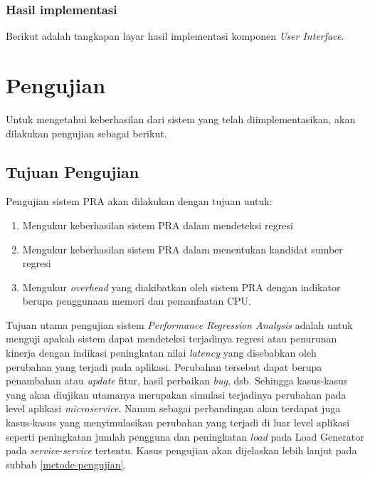 \subsubsection{Hasil implementasi}
Berikut adalah tangkapan layar hasil implementasi komponen \textit{User Interface}.

\pagebreak

\section{Pengujian}
Untuk mengetahui keberhasilan dari sistem yang telah diimplementasikan, akan dilakukan pengujian sebagai berikut.
\subsection{Tujuan Pengujian}
Pengujian sistem PRA akan dilakukan dengan tujuan untuk:
\begin{enumerate}
	\item Mengukur keberhasilan sistem PRA dalam mendeteksi regresi
	\item Mengukur keberhasilan sistem PRA dalam menentukan kandidat sumber regresi
	\item Mengukur \textit{overhead} yang diakibatkan oleh sistem PRA dengan
	indikator berupa penggunaan memori dan pemanfaatan CPU.
\end{enumerate}

Tujuan utama pengujian sistem \textit{Performance Regression Analysis} adalah untuk menguji apakah sistem dapat mendeteksi terjadinya regresi atau penurunan kinerja dengan indikasi peningkatan nilai \textit{latency} yang disebabkan oleh perubahan yang terjadi pada aplikasi. Perubahan tersebut dapat berupa penambahan atau \textit{update} fitur, hasil perbaikan \textit{bug}, dsb. Sehingga kasus-kasus yang akan diujikan utamanya merupakan simulasi terjadinya perubahan pada level aplikasi \textit{microservice}. Namun sebagai perbandingan akan terdapat juga kasus-kasus yang menyimulasikan perubahan yang terjadi di luar level aplikasi seperti peningkatan jumlah pengguna dan peningkatan \textit{load} pada Load Generator pada \textit{service}-\textit{service} tertentu. Kasus pengujian akan dijelaskan lebih lanjut pada subbab \ref{metode-pengujian}.
\pagebreak

